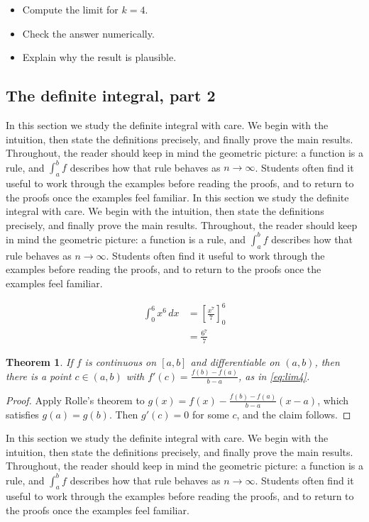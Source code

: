\documentclass[11pt]{article}
\newtheorem{theorem}{Theorem}[section]
\begin{document}
\begin{itemize}
  \item Compute the limit for $k = 4$.
  \item Check the answer numerically.
  \item Explain why the result is plausible.
\end{itemize}

\subsection{The definite integral, part 2}

In this section we study the definite integral with care. We begin with the intuition, then state the definitions precisely, and finally prove the main results. Throughout, the reader should keep in mind the geometric picture: a function is a rule, and $\int_a^b f$ describes how that rule behaves as $n \to \infty$. Students often find it useful to work through the examples before reading the proofs, and to return to the proofs once the examples feel familiar. In this section we study the definite integral with care. We begin with the intuition, then state the definitions precisely, and finally prove the main results. Throughout, the reader should keep in mind the geometric picture: a function is a rule, and $\int_a^b f$ describes how that rule behaves as $n \to \infty$. Students often find it useful to work through the examples before reading the proofs, and to return to the proofs once the examples feel familiar. 

\begin{align}
  \int_0^{6} x^{6}\,dx &= \left[ \frac{x^{7}}{7} \right]_0^{6} \\
  &= \frac{6^{7}}{7} \label{eq:int4}
\end{align}

\begin{theorem}
If $f$ is continuous on $[a,b]$ and differentiable on $(a,b)$, then there is a point $c \in (a,b)$ with $f'(c) = \frac{f(b)-f(a)}{b-a}$, as in \eqref{eq:lim4}.
\end{theorem}

\begin{proof}
Apply Rolle's theorem to $g(x) = f(x) - \frac{f(b)-f(a)}{b-a}(x-a)$, which satisfies $g(a) = g(b)$. Then $g'(c) = 0$ for some $c$, and the claim follows.
\end{proof}

In this section we study the definite integral with care. We begin with the intuition, then state the definitions precisely, and finally prove the main results. Throughout, the reader should keep in mind the geometric picture: a function is a rule, and $\int_a^b f$ describes how that rule behaves as $n \to \infty$. Students often find it useful to work through the examples before reading the proofs, and to return to the proofs once the examples feel familiar. 
\end{document}
